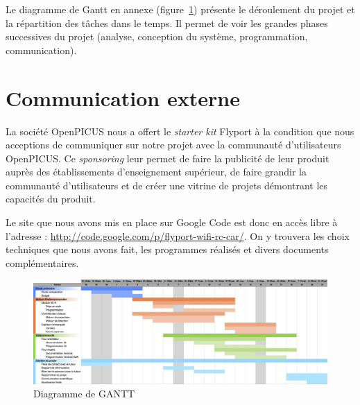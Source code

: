 \documentclass[a4paper,12pt]{report}
\begin{document}
	Le diagramme de Gantt en annexe (figure~\ref{gantt}) présente le déroulement du projet et la répartition des tâches dans le temps. Il permet de voir les grandes phases successives du projet (analyse, conception du système, programmation, communication).
	
	
	\section{Communication externe}
	La société OpenPICUS nous a offert le \emph{starter kit} Flyport à la condition que nous acceptions de communiquer sur notre projet avec la communauté d'utilisateurs OpenPICUS. Ce \emph{sponsoring} leur permet de faire la publicité de leur produit auprès des établissements d'enseignement supérieur, de faire grandir la communauté d'utilisateurs et de créer une vitrine de projets démontrant les capacités du produit.
	
	Le site que nous avons mis en place sur Google Code est donc en accès libre à l'adresse : \href{http://code.google.com/p/flyport-wifi-rc-car/}{http://code.google.com/p/flyport-wifi-rc-car/}. On y trouvera les choix techniques que nous avons fait, les programmes réalisés et divers documents complémentaires.
	
\begin{figure}
\centering
\includegraphics[scale=0.35]{images/gantt.png}
\caption{Diagramme de GANTT}
\label{gantt}
\end{figure}

\end{document}
